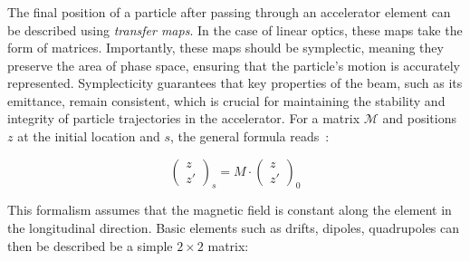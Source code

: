 \subsubsection{}
\label{section:coordinate_systems:linear_maps}

The final position of a particle after passing through an accelerator element can be described using
\textit{transfer maps}. In the case of linear optics, these maps take the form of matrices.
Importantly, these maps should be symplectic, meaning they preserve the area of phase space,
ensuring that the particle's motion is accurately represented. Symplecticity guarantees that key
properties of the beam, such as its emittance, remain consistent, which is crucial for maintaining
the stability and integrity of particle trajectories in the accelerator.
For a matrix $\mathcal{M}$ and positions $z$ at the initial location and $s$, the general formula
reads~\cite{lee_accelerator_2004}:

\begin{equation}
    \begin{pmatrix}
        z \\
        z'
    \end{pmatrix}_s
    = M \cdot 
    \begin{pmatrix}
        z \\
        z'
    \end{pmatrix}_0
\end{equation}

This formalism assumes that the magnetic field is constant along the element in the longitudinal
direction. Basic elements such as drifts, dipoles, quadrupoles can then be described be a simple
$2 \times 2$ matrix:

